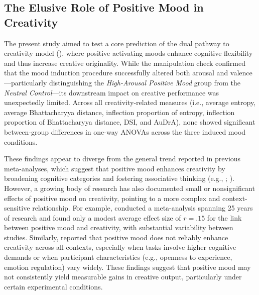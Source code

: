 \documentclass[../MA_Thesis.tex]{subfiles}
\begin{document}
\subsection*{The Elusive Role of Positive Mood in Creativity}
The present study aimed to test a core prediction of the dual pathway to creativity model (\cite{nijstad_dual_2010}), where positive activating moods enhance cognitive flexibility and thus increase creative originality. While the manipulation check confirmed that the mood induction procedure successfully altered both arousal and valence—particularly distinguishing the \textit{High-Arousal Positive Mood} group from the \textit{Neutral Control}—its downstream impact on creative performance was unexpectedly limited.
Across all creativity-related measures (i.e., average entropy, average Bhattacharyya distance, inflection proportion of entropy, inflection proportion of Bhattacharyya distance, DSI, and AuDrA), none showed significant between-group differences in one-way ANOVAs across the three induced mood conditions.

These findings appear to diverge from the general trend reported in previous meta-analyses, which suggest that positive mood enhances creativity by broadening cognitive categories and fostering associative thinking (e.g., \cite{davis_understanding_2009}; \cite{fredrickson_role_2001}). However, a growing body of research has also documented small or nonsignificant effects of positive mood on creativity, pointing to a more complex and context-sensitive relationship. For example, \textcite{baas_meta-analysis_2008} conducted a meta-analysis spanning 25 years of research and found only a modest average effect size of $r = .15$ for the link between positive mood and creativity, with substantial variability between studies. Similarly, \textcite{zenasni_effects_2002} reported that positive mood does not reliably enhance creativity across all contexts, especially when tasks involve higher cognitive demands or when participant characteristics (e.g., openness to experience, emotion regulation) vary widely. These findings suggest that positive mood may not consistently yield measurable gains in creative output, particularly under certain experimental conditions.
\end{document}
